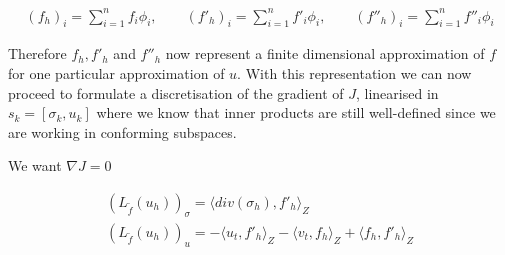 \documentclass[../draft_1.tex]{subfiles}
\begin{document}
\begin{ceqn}
	\begin{align}
(f_h)_i = \sum_{i=1}^{n} f_i \phi_i, \qquad (f'_h)_i = \sum_{i=1}^{n} f'_i \phi_i, \qquad (f''_h)_i = \sum_{i=1}^{n} f''_i \phi_i
	\end{align}
\end{ceqn}
Therefore $f_h, f'_h$ and $f''_h$ now represent a finite dimensional approximation of $f$ for one particular approximation of $u$. With this representation we can now proceed to formulate a discretisation of the gradient of $J$, linearised in $s_k = [\sigma_k, u_k]$ where we know that inner products are still well-defined since we are working in conforming subspaces.

We want $\nabla J = 0$

\begin{ceqn}
	\begin{align}
 (L_{\tilde{f}}(u_h))_{\sigma} = \langle div(\sigma_h), f'_h \rangle_Z\\
  (L_{\tilde{f}}(u_h))_{u} = - \langle u_t, f'_h \rangle_Z - \langle v_t, f_h \rangle_Z  + \langle f_h, f'_h \rangle_Z 
	\end{align}
\end{ceqn}
\end{document}
